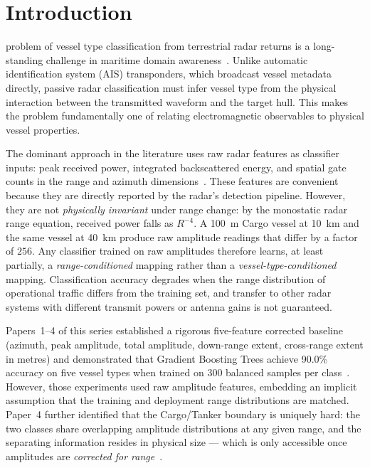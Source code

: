 \documentclass[journal]{IEEEtran}
\begin{document}
\maketitle
\IEEEdisplaynontitleabstractindextext
\IEEEpeerreviewmaketitle

\section{Introduction}
\label{sec:intro}

 problem of vessel type classification from terrestrial
radar returns is a long-standing challenge in maritime domain
awareness~\cite{skolnik2001,ward2013seaclutter}. Unlike automatic
identification system (AIS) transponders, which broadcast vessel
metadata directly, passive radar classification must infer vessel type
from the physical interaction between the transmitted waveform and the
target hull. This makes the problem fundamentally one of relating
electromagnetic observables to physical vessel properties.

The dominant approach in the literature uses raw radar features as
classifier inputs: peak received power, integrated backscattered
energy, and spatial gate counts in the range and azimuth
dimensions~\cite{haykin1991clutter,shepherd2022vessel}. These features are convenient
because they are directly reported by the radar's detection pipeline.
However, they are not \emph{physically invariant} under range change:
by the monostatic radar range equation, received power falls as
$R^{-4}$. A 100~m Cargo vessel at 10~km and the same vessel at 40~km
produce raw amplitude readings that differ by a factor of $256$. Any
classifier trained on raw amplitudes therefore learns, at least
partially, a \emph{range-conditioned} mapping rather than a
\emph{vessel-type-conditioned} mapping. Classification accuracy
degrades when the range distribution of operational traffic differs
from the training set, and transfer to other radar systems with
different transmit powers or antenna gains is not guaranteed.

Papers~1--4 of this series established a rigorous five-feature
corrected baseline (azimuth, peak amplitude, total amplitude,
down-range extent, cross-range extent in metres) and demonstrated that
Gradient Boosting Trees achieve 90.0\% accuracy on five vessel types
when trained on 300 balanced samples per class~\cite{paper1features}.
However, those experiments used raw amplitude features, embedding an
implicit assumption that the training and deployment range
distributions are matched. Paper~4 further identified that the
Cargo/Tanker boundary is uniquely hard: the two classes share
overlapping amplitude distributions at any given range, and the
separating information resides in physical size — which is only
accessible once amplitudes are \emph{corrected for range}~\cite{paper4cargotanker}.
\end{document}
